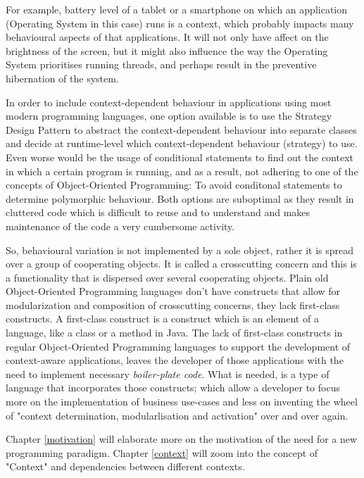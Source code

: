 \documentclass{acm_proc_article-sp}
\begin{document}
For example, battery level of a tablet or a smartphone on which an application (Operating System in this case) runs is a context, which probably impacts many behavioural aspects of that applications. It will not only have affect on the brightness of the screen, but it might also influence the way the Operating System prioritises running threads, and perhaps result in the preventive hibernation of the system.

In order to include context-dependent behaviour in applications using most modern programming languages, one option available is to use the Strategy Design Pattern \cite{strategypattern} to abstract the context-dependent behaviour into separate classes and decide at runtime-level which context-dependent behaviour (strategy) to use. Even worse would be the usage of conditional statements to find out the context in which a certain program is running, and as a result, not adhering to one of the concepts of Object-Oriented Programming: To avoid conditonal statements to determine polymorphic behaviour. Both options are suboptimal as they result in cluttered code which is difficult to reuse and to understand and makes maintenance of the code a very cumbersome activity.

So, behavioural variation is not implemented by a sole object, rather it is spread over a group of cooperating objects. It is called a crosscutting concern \cite{kiczalesetallaop} and this is a functionality that is dispersed over several cooperating objects. Plain old Object-Oriented Programming languages don't have constructs that allow for modularization and composition of crosscutting concerns, they lack first-class constructs. A first-class construct \cite{Keays:2003:CP:940923.940926} is a construct which is an element of a language, like a class or a method in Java. The lack of first-class constructs in regular Object-Oriented Programming languages to support the development of context-aware applications, leaves the developer of those applications with the need to implement necessary \textit{boiler-plate code}. What is needed, is a type of language that incorporates those constructs; which allow a developer to focus more on the implementation of business use-cases and less on inventing the wheel of "context determination, modularlisation and activation" over and over again. 

Chapter \ref{motivation} will elaborate more on the motivation of the need for a new programming paradigm. Chapter \ref{context} will zoom into the concept of "Context" and dependencies between different contexts. 
\end{document}
